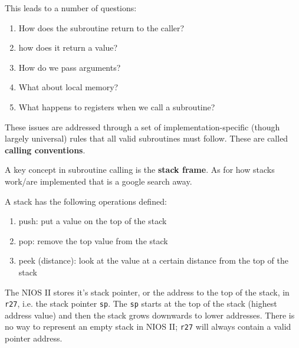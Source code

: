 \documentclass[../notes.tex]{subfiles}
\begin{document}
This leads to a number of questions:

\begin{enumerate}
	\item How does the subroutine return to the caller?
	\item how does it return a value?
	\item How do we pass arguments?
	\item What about local memory?
	\item What happens to registers when we call a subroutine?
\end{enumerate}


These issues are addressed through a set of implementation-specific (though largely universal) rules that all valid subroutines must follow. These are called \textbf{calling conventions}.



\begin{definition}
	A key concept in subroutine calling is the \textbf{stack frame}. As for how stacks work/are implemented that is a google search away.

	A stack has the following operations defined:

		\begin{enumerate}
			\item push: put a value on the top of the stack
			\item pop: remove the top value from the stack
			\item peek (distance): look at the value at a certain distance from the top of the stack
		\end{enumerate}

\end{definition}


	The NIOS II stores it's stack pointer, or the address to the top of the stack, in \texttt{r27}, i.e. the stack pointer \texttt{sp}.
	The \texttt{sp}  starts at the top of the stack (highest address value) and then the stack grows downwards to lower addresses.
	There is no way to represent an empty stack in NIOS II; \texttt{r27} will always contain a valid pointer address.
\end{document}
